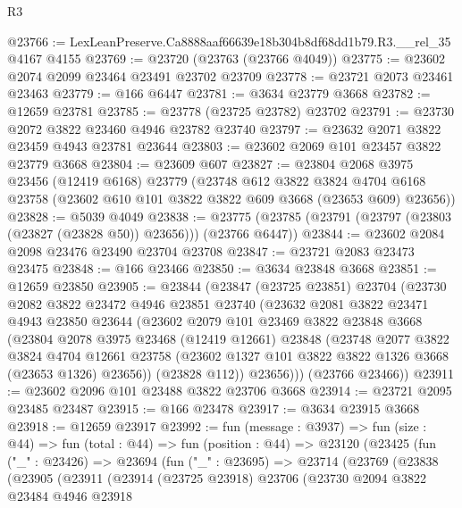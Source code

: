 \begin{lexlean}{R3}
\begin{coremodule}
@23766 := LexLeanPreserve.Ca8888aaf66639e18b304b8df68dd1b79.R3.__rel_35 @4167 @4155
@23769 := @23720 (@23763 (@23766 @4049))
@23775 := @23602 @2074 @2099 @23464 @23491 @23702 @23709
@23778 := @23721 @2073 @23461 @23463
@23779 := @166 @6447
@23781 := @3634 @23779 @3668
@23782 := @12659 @23781
@23785 := @23778 (@23725 @23782) @23702
@23791 := @23730 @2072 @3822 @23460 @4946 @23782 @23740
@23797 := @23632 @2071 @3822 @23459 @4943 @23781 @23644
@23803 := @23602 @2069 @101 @23457 @3822 @23779 @3668
@23804 := @23609 @607
@23827 := @23804
    @2068
    @3975
    @23456
    (@12419 @6168)
    @23779
    (@23748
      @612
      @3822
      @3824
      @4704
      @6168
      @23758
      (@23602 @610 @101 @3822 @3822 @609 @3668 (@23653 @609) @23656))
@23828 := @5039 @4049
@23838 := @23775 (@23785 (@23791 (@23797 (@23803 (@23827 (@23828 @50)) @23656))) (@23766 @6447))
@23844 := @23602 @2084 @2098 @23476 @23490 @23704 @23708
@23847 := @23721 @2083 @23473 @23475
@23848 := @166 @23466
@23850 := @3634 @23848 @3668
@23851 := @12659 @23850
@23905 := @23844
    (@23847
      (@23725 @23851)
      @23704
      (@23730
        @2082
        @3822
        @23472
        @4946
        @23851
        @23740
        (@23632
          @2081
          @3822
          @23471
          @4943
          @23850
          @23644
          (@23602
            @2079
            @101
            @23469
            @3822
            @23848
            @3668
            (@23804
              @2078
              @3975
              @23468
              (@12419 @12661)
              @23848
              (@23748
                @2077
                @3822
                @3824
                @4704
                @12661
                @23758
                (@23602 @1327 @101 @3822 @3822 @1326 @3668 (@23653 @1326) @23656))
              (@23828 @112))
            @23656)))
      (@23766 @23466))
@23911 := @23602 @2096 @101 @23488 @3822 @23706 @3668
@23914 := @23721 @2095 @23485 @23487
@23915 := @166 @23478
@23917 := @3634 @23915 @3668
@23918 := @12659 @23917
@23992 := fun (message : @3937) =>
  fun (size : @44) =>
  fun (total : @44) =>
  fun (position : @44) =>
  @23120
    (@23425
      (fun ("_" : @23426) =>
      @23694
        (fun ("_" : @23695) =>
        @23714
          (@23769
            (@23838
              (@23905
                (@23911
                  (@23914
                    (@23725 @23918)
                    @23706
                    (@23730
                      @2094
                      @3822
                      @23484
                      @4946
                      @23918

\end{coremodule}
\end{lexlean}
